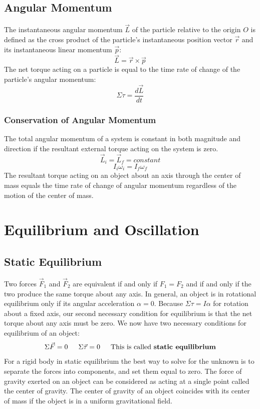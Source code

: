 \documentclass{article}
\begin{document}
	\subsection{Angular Momentum}
    	The instantaneous angular momentum $\vec{L}$ of the particle relative to the origin $O$ is defined as the cross product of the particle’s instantaneous position vector $\vec{r}$ and its instantaneous linear momentum $\vec{p}$:
        \[
        	\vec{L}=\vec{r}\times\vec{p}
        \]
        The net torque acting on a particle is equal to the time rate of change of the particle’s angular momentum:
        \[
        	\Sigma\tau=\frac{d\vec{L}}{dt}
        \]
        \subsubsection{Conservation of Angular Momentum}
        	The total angular momentum of a system is constant in both magnitude and direction if the resultant external torque acting on the system is zero.
            \[
            	\vec{L}_i=\vec{L}_f=constant
            \]
            \[
            	I_i\omega_i=I_f\omega_f
            \]
            The resultant torque acting on an object about an axis through the center of mass equals the time rate of change of angular momentum regardless of the motion of the center of mass.
            
\section{Equilibrium and Oscillation}
	\subsection{Static Equilibrium}
    	Two forces $\vec{F}_1$ and $\vec{F}_2$ are equivalent if and only if $F_1=F_2$ and if and only if the two produce the same torque about any axis. In general, an object is in rotational equilibrium only if its angular acceleration $\alpha=0$. Because $\Sigma\tau=I\alpha$ for rotation about a fixed axis, our second necessary condition for equilibrium is that the net torque about any axis must be zero. We now have two necessary conditions for equilibrium of an object:
        \[
        	\Sigma\vec{F}=0 \indent
            \Sigma\vec{\tau}=0 \indent
            \text{This is called \textbf{static equilibrium}}
        \]
        For a rigid body in static equilibrium the best way to solve for the unknown is to separate the forces into components, and set them equal to zero. The force of gravity exerted on an object can be considered as acting at a single point called the center of gravity. The center of gravity of an object coincides with its center of mass if the object is in a uniform gravitational field.
        
\end{document}
